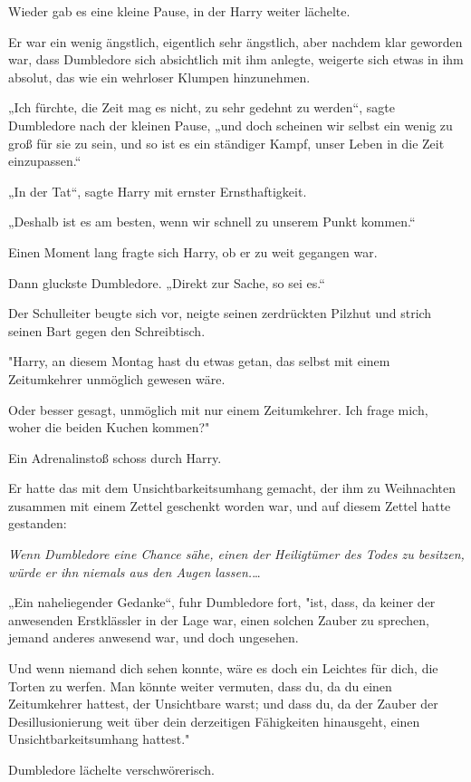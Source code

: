 {Wieder gab es eine kleine Pause, in der Harry weiter lächelte.

Er war ein wenig ängstlich, eigentlich sehr ängstlich, aber nachdem klar geworden war, dass Dumbledore sich absichtlich mit ihm anlegte, weigerte sich etwas in ihm absolut, das wie ein wehrloser Klumpen hinzunehmen.

„Ich fürchte, die Zeit mag es nicht, zu sehr gedehnt zu werden“, sagte Dumbledore nach der kleinen Pause, „und doch scheinen wir selbst ein wenig zu groß für sie zu sein, und so ist es ein ständiger Kampf, unser Leben in die Zeit einzupassen.“

„In der Tat“, sagte Harry mit ernster Ernsthaftigkeit.

„Deshalb ist es am besten, wenn wir schnell zu unserem Punkt kommen.“

Einen Moment lang fragte sich Harry, ob er zu weit gegangen war.

Dann gluckste Dumbledore. „Direkt zur Sache, so sei es.“

Der Schulleiter beugte sich vor, neigte seinen zerdrückten Pilzhut und strich seinen Bart gegen den Schreibtisch.

"Harry, an diesem Montag hast du etwas getan, das selbst mit einem Zeitumkehrer unmöglich gewesen wäre.

Oder besser gesagt, unmöglich mit nur einem Zeitumkehrer. Ich frage mich, woher die beiden Kuchen kommen?"

Ein Adrenalinstoß schoss durch Harry.

Er hatte das mit dem Unsichtbarkeitsumhang gemacht, der ihm zu Weihnachten zusammen mit einem Zettel geschenkt worden war, und auf diesem Zettel hatte gestanden:

\emph{Wenn Dumbledore eine Chance sähe, einen der Heiligtümer des Todes zu besitzen, würde er ihn} \emph{niemals aus den Augen lassen.}…

„Ein naheliegender Gedanke“, fuhr Dumbledore fort, "ist, dass, da keiner der anwesenden Erstklässler in der Lage war, einen solchen Zauber zu sprechen, jemand anderes anwesend war, und doch ungesehen.

Und wenn niemand dich sehen konnte, wäre es doch ein Leichtes für dich, die Torten zu werfen. Man könnte weiter vermuten, dass du, da du einen Zeitumkehrer hattest, der Unsichtbare warst; und dass du, da der Zauber der Desillusionierung weit über dein derzeitigen Fähigkeiten hinausgeht, einen Unsichtbarkeitsumhang hattest."

Dumbledore lächelte verschwörerisch.

}

